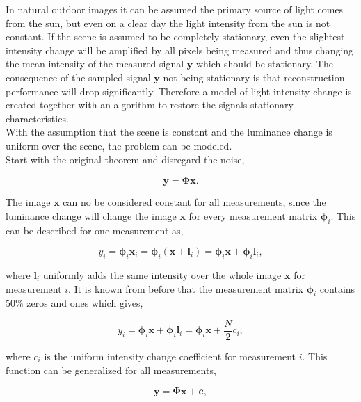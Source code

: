 In natural outdoor images it can be assumed the primary source of light comes from the sun, but even on a clear day the light intensity from the sun is not constant. If the scene is assumed to be completely stationary, even the slightest intensity change will be amplified by all pixels being measured and thus changing the mean intensity of the measured signal $\mathbf{y}$ which should be stationary. The consequence of the sampled signal $\mathbf{y}$ not being stationary is that reconstruction performance will drop significantly. Therefore a model of light intensity change is created together with an algorithm to restore the signals stationary characteristics.\\[0.1in] 


With the assumption that the scene is constant and the luminance change is uniform over the scene, the problem can be modeled.\\[0.1in]

Start with the original theorem and disregard the noise, 

\begin{equation}
\mathbf{y} = \mathbf{\Phi}\mathbf{x}.
\end{equation}  

The image $\mathbf{x}$ can no be considered constant for all measurements, since the luminance change will change the image $\mathbf{x}$ for every measurement matrix $\mathbf{\phi}_i$. This can be described for one measurement as,  

\begin{equation}
y_i = \mathbf{\phi}_i\mathbf{x}_i = \mathbf{\phi}_i(\mathbf{x} + \mathbf{l}_i) = \mathbf{\phi}_i\mathbf{x} + \mathbf{\phi}_i\mathbf{l}_i ,
\end{equation}
  
where $\mathbf{l}_i$ uniformly adds the same intensity over the whole image $\mathbf{x}$ for measurement $i$. It is known from before that the measurement matrix $\mathbf{\phi}_i$ contains $50\%$ zeros and ones which gives,

\begin{equation}
y_i = \mathbf{\phi}_i\mathbf{x} + \mathbf{\phi}_i\mathbf{l}_i = \mathbf{\phi}_i\mathbf{x} + \frac{N}{2}c_i,
\end{equation}

where $c_i$ is the uniform intensity change coefficient for measurement $i$. This function can be generalized for all measurements,

\begin{equation}
\mathbf{y} =  \mathbf{\Phi}\mathbf{x} + \mathbf{c},
\end{equation}

